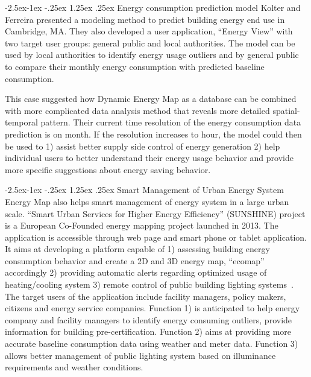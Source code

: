 \documentclass[hidelinks,12pt]{article}
\makeatletter
\renewcommand\paragraph{\@startsection{paragraph}{4}{\z@}%
            {-2.5ex\@plus -1ex \@minus -.25ex}%
            {1.25ex \@plus .25ex}%
            {\normalfont\normalsize\bfseries}}
\makeatother
\begin{document}
\paragraph{Energy consumption prediction model}
Kolter and Ferreira presented a modeling method to predict building
energy end use in Cambridge, MA. They also developed a user
application, ``Energy View'' with two target user groups: general
public and local authorities. The model can be used by local
authorities to identify energy usage outliers and by general public to
compare their monthly energy consumption with predicted baseline
consumption. 

This case suggested how Dynamic Energy Map as a database can be
combined with more complicated data analysis method that reveals more
detailed spatial-temporal pattern. Their current time resolution of
the energy consumption data prediction is on month. If the resolution
increases to hour, the model could then be used to 1) assist better
supply side control of energy generation 2) help individual users to
better understand their energy usage behavior and provide more specific
suggestions about energy saving behavior.

\paragraph{Smart Management of Urban Energy System}
Energy Map also helps smart management of energy system in a large
urban scale. ``Smart Urban Services for Higher Energy Efficiency''
(SUNSHINE) project is a European Co-Founded energy mapping project
launched in 2013. The application is accessible through web page and
smart phone or tablet application. It aims at developing a platform
capable of 1) assessing building energy consumption behavior and
create a 2D and 3D energy map, ``ecomap'' accordingly 2) providing
automatic alerts regarding optimized usage of heating/cooling system
3) remote control of public building lighting
systems~\cite{SUNSHINE2015}. The target users of the application
include facility managers, policy makers, citizens and energy service
companies. Function 1) is anticipated to help energy company and
facility managers to identify energy consuming outliers, provide
information for building pre-certification. Function 2) aims at
providing more accurate baseline consumption data using weather and
meter data. Function 3) allows better management of public lighting
system based on illuminance requirements and weather conditions.
\end{document}
